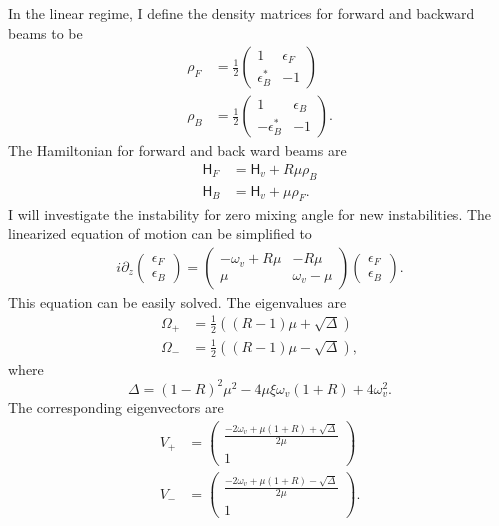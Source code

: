 In the linear regime, I define the density matrices for forward and backward beams to be
\begin{align*}
   \rho_F &= \frac{1}{2} \begin{pmatrix}
   1 & \epsilon_F \\
   \epsilon_B^* & -1
   \end{pmatrix} \\
   \rho_B &= \frac{1}{2} \begin{pmatrix}
   1 & \epsilon_B \\-
   \epsilon_B^* & -1
   \end{pmatrix}.
\end{align*}
The Hamiltonian for forward and back ward beams are
\begin{align*}
   \mathsf H_F &= \mathsf H_v + R \mu \rho_B \\
   \mathsf H_B &= \mathsf H_v + \mu \rho_F.
\end{align*}
I will investigate the instability for zero mixing angle for new instabilities. The linearized equation of motion can be simplified to
\begin{align*}
   i\partial_z \begin{pmatrix}
   \epsilon_F \\
   \epsilon_B
   \end{pmatrix} = \begin{pmatrix}
   -\omega_v + R \mu & - R  \mu \\
   \mu & \omega_v -  \mu
   \end{pmatrix} \begin{pmatrix}
   \epsilon_F \\
   \epsilon_B
   \end{pmatrix}.
\end{align*}
This equation can be easily solved. The eigenvalues are
\begin{align*}
   \Omega_+ &= \frac{1}{2} ( (R-1)\mu + \sqrt{\Delta} ) \\
   \Omega_- &= \frac{1}{2} ( (R-1)\mu - \sqrt{\Delta} ),
\end{align*}
where
\begin{equation}
   \Delta = (1-R)^2 \mu^2  - 4\mu\xi \omega_v (1+R) + 4\omega_v^2.
\end{equation}
The corresponding eigenvectors are
\begin{align*}
   V_+ &=\begin{pmatrix}
   \frac{ -2\omega_v +  \mu (1+R) + \sqrt{\Delta} }{2\mu} \\
   1
   \end{pmatrix} \\
   V_- &=\begin{pmatrix}
   \frac{ -2\omega_v +  \mu (1+R) - \sqrt{\Delta} }{2\mu} \\
   1
   \end{pmatrix}.
\end{align*}
